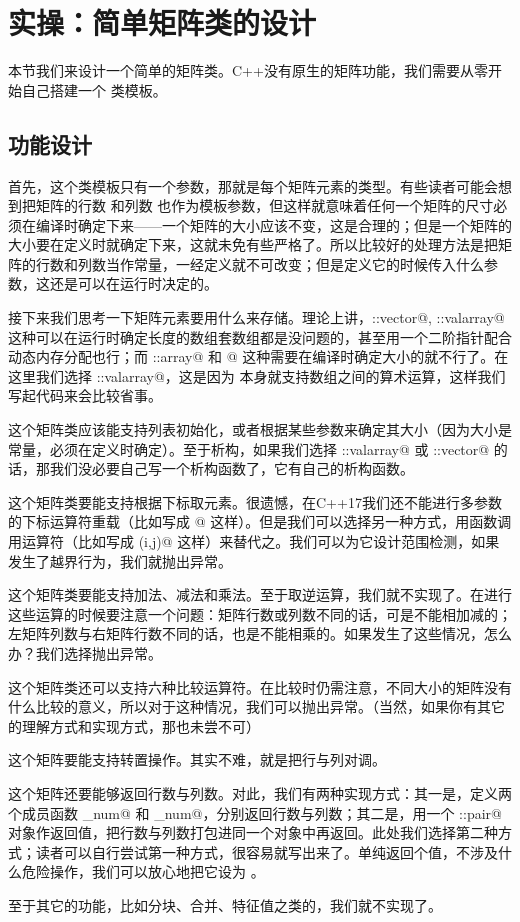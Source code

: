\section{实操：简单矩阵类的设计}
本节我们来设计一个简单的矩阵类。C++没有原生的矩阵功能，我们需要从零开始自己搭建一个 \lstinline@Matrix@ 类模板。\par
\subsection*{功能设计}
首先，这个类模板只有一个参数，那就是每个矩阵元素的类型。有些读者可能会想到把矩阵的行数 \lstinline@N@ 和列数 \lstinline@M@ 也作为模板参数，但这样就意味着任何一个矩阵的尺寸必须在编译时确定下来——一个矩阵的大小应该不变，这是合理的；但是一个矩阵的大小要在定义时就确定下来，这就未免有些严格了。所以比较好的处理方法是把矩阵的行数和列数当作常量，一经定义就不可改变；但是定义它的时候传入什么参数，这还是可以在运行时决定的。\par
接下来我们思考一下矩阵元素要用什么来存储。理论上讲，\lstinline@std::vector@, \lstinline@std::valarray@ 这种可以在运行时确定长度的数组套数组都是没问题的，甚至用一个二阶指针配合动态内存分配也行；而 \lstinline@std::array@ 和 \lstinline@int[N][M]@ 这种需要在编译时确定大小的就不行了。在这里我们选择 \lstinline@std::valarray@，这是因为 \lstinline@valarray@ 本身就支持数组之间的算术运算，这样我们写起代码来会比较省事。\par
这个矩阵类应该能支持列表初始化，或者根据某些参数来确定其大小（因为大小是常量，必须在定义时确定）。至于析构，如果我们选择 \lstinline@std::valarray@ 或 \lstinline@std::vector@ 的话，那我们没必要自己写一个析构函数了，它有自己的析构函数。\par
这个矩阵类要能支持根据下标取元素。很遗憾，在C++17我们还不能进行多参数的下标运算符重载（比如写成 \lstinline@mat[i,j]@ 这样）。但是我们可以选择另一种方式，用函数调用运算符（比如写成 \lstinline@mat(i,j)@ 这样）来替代之。我们可以为它设计范围检测，如果发生了越界行为，我们就抛出异常。\par
这个矩阵类要能支持加法、减法和乘法。至于取逆运算，我们就不实现了。在进行这些运算的时候要注意一个问题：矩阵行数或列数不同的话，可是不能相加减的；左矩阵列数与右矩阵行数不同的话，也是不能相乘的。如果发生了这些情况，怎么办？我们选择抛出异常。\par
这个矩阵类还可以支持六种比较运算符。在比较时仍需注意，不同大小的矩阵没有什么比较的意义，所以对于这种情况，我们可以抛出异常。（当然，如果你有其它的理解方式和实现方式，那也未尝不可）\par
这个矩阵要能支持转置操作。其实不难，就是把行与列对调。\par
这个矩阵还要能够返回行数与列数。对此，我们有两种实现方式：其一是，定义两个成员函数 \lstinline@row_num@ 和 \lstinline@col_num@，分别返回行数与列数；其二是，用一个 \lstinline@std::pair@ 对象作返回值，把行数与列数打包进同一个对象中再返回。此处我们选择第二种方式；读者可以自行尝试第一种方式，很容易就写出来了。单纯返回个值，不涉及什么危险操作，我们可以放心地把它设为 \lstinline@noexcept@。\par
至于其它的功能，比如分块、合并、特征值之类的，我们就不实现了。\par
